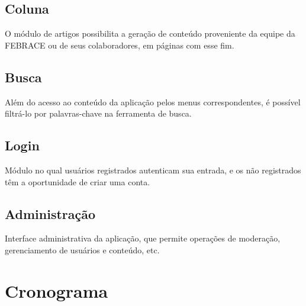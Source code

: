 \documentclass[a4paper,12pt,font=plain,header=plain]{abnt}
\begin{document}
    \subsection{Coluna}
    O módulo de artigos possibilita a geração de conteúdo proveniente da equipe da FEBRACE ou de seus colaboradores, em páginas com esse fim.

    \subsection{Busca}
    Além do acesso ao conteúdo da aplicação pelos menus correspondentes, é possível filtrá-lo por palavras-chave na ferramenta de busca.

    \subsection{Login}
    Módulo no qual usuários registrados autenticam sua entrada, e os não registrados têm a oportunidade de criar uma conta.

    \subsection{Administração}
    Interface administrativa da aplicação, que permite operações de moderação, gerenciamento de usuários e conteúdo, etc.

  \section{Cronograma}
\end{document}
